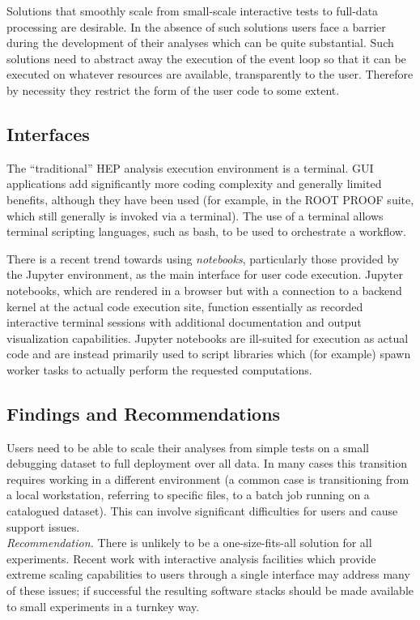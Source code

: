 Solutions that smoothly scale from small-scale interactive tests to full-data processing are desirable. In the absence of such solutions users face a barrier during the development of their analyses which can be quite substantial. Such solutions need to abstract away the execution of the event loop so that it can be executed on whatever resources are available, transparently to the user. Therefore by necessity they restrict the form of the user code to some extent. 


\subsection{Interfaces}

The ``traditional'' HEP analysis execution environment is a terminal. GUI applications add significantly more coding complexity and generally limited benefits, although they have been used (for example, in the ROOT PROOF suite, which still generally is invoked via a terminal). The use of a terminal allows terminal scripting languages, such as bash, to be used to orchestrate a workflow.

There is a recent trend towards using \textit{notebooks}, particularly those provided by the Jupyter environment, as the main interface for user code execution. Jupyter notebooks, which are rendered in a browser but with a connection to a backend kernel at the actual code execution site, function essentially as recorded interactive terminal sessions with additional documentation and output visualization capabilities. Jupyter notebooks are ill-suited for execution as actual code and are instead primarily used to script libraries which (for example) spawn worker tasks to actually perform the requested computations.

\subsection{Findings and Recommendations}
Users need to be able to scale their analyses from simple tests on a small debugging dataset to full deployment over all data. In many cases this transition requires working in a different environment (a common case is transitioning from a local workstation, referring to specific files, to a batch job running on a catalogued dataset). This can involve significant difficulties for users and cause support issues.\\
\textit{Recommendation.} There is unlikely to be a one-size-fits-all solution for all experiments. Recent work with interactive analysis facilities which provide extreme scaling capabilities to users through a single interface may address many of these issues; if successful the resulting software stacks should be made available to small experiments in a turnkey way.


